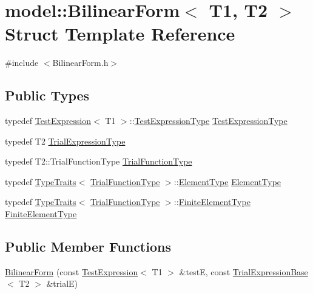 \hypertarget{structmodel_1_1_bilinear_form}{}\section{model\+:\+:Bilinear\+Form$<$ T1, T2 $>$ Struct Template Reference}
\label{structmodel_1_1_bilinear_form}


{\ttfamily \#include $<$Bilinear\+Form.\+h$>$}

\subsection*{Public Types}
\begin{DoxyCompactItemize}
\item 
typedef \hyperlink{structmodel_1_1_test_expression}{Test\+Expression}$<$ T1 $>$\+::\hyperlink{structmodel_1_1_bilinear_form_a9283d1ee67b9315a45ee36453e74f1e2}{Test\+Expression\+Type} \hyperlink{structmodel_1_1_bilinear_form_a9283d1ee67b9315a45ee36453e74f1e2}{Test\+Expression\+Type}
\item 
typedef T2 \hyperlink{structmodel_1_1_bilinear_form_a21b1c21cf69ff157ef055fdd51754523}{Trial\+Expression\+Type}
\item 
typedef T2\+::\+Trial\+Function\+Type \hyperlink{structmodel_1_1_bilinear_form_acdc65f00a3d62200e21387bdbbb6eedd}{Trial\+Function\+Type}
\item 
typedef \hyperlink{structmodel_1_1_type_traits}{Type\+Traits}$<$ \hyperlink{structmodel_1_1_bilinear_form_acdc65f00a3d62200e21387bdbbb6eedd}{Trial\+Function\+Type} $>$\+::\hyperlink{structmodel_1_1_bilinear_form_a913af0f41b1e5dc3de899a221d0351c4}{Element\+Type} \hyperlink{structmodel_1_1_bilinear_form_a913af0f41b1e5dc3de899a221d0351c4}{Element\+Type}
\item 
typedef \hyperlink{structmodel_1_1_type_traits}{Type\+Traits}$<$ \hyperlink{structmodel_1_1_bilinear_form_acdc65f00a3d62200e21387bdbbb6eedd}{Trial\+Function\+Type} $>$\+::\hyperlink{structmodel_1_1_bilinear_form_a65a70814fa4b79b108aa83563c825408}{Finite\+Element\+Type} \hyperlink{structmodel_1_1_bilinear_form_a65a70814fa4b79b108aa83563c825408}{Finite\+Element\+Type}
\end{DoxyCompactItemize}
\subsection*{Public Member Functions}
\begin{DoxyCompactItemize}
\item 
\hyperlink{structmodel_1_1_bilinear_form_ae92ea354040da1bdf5286528ec52411b}{Bilinear\+Form} (const \hyperlink{structmodel_1_1_test_expression}{Test\+Expression}$<$ T1 $>$ \&test\+E, const \hyperlink{structmodel_1_1_trial_expression_base}{Trial\+Expression\+Base}$<$ T2 $>$ \&trial\+E)
\end{DoxyCompactItemize}

